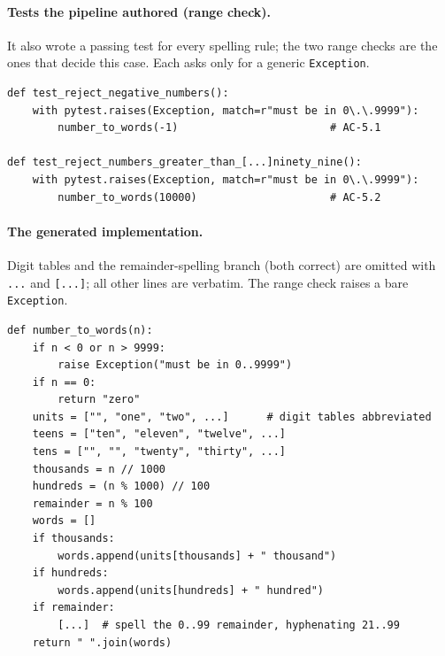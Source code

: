 \paragraph{Tests the pipeline authored (range check).} It also wrote a passing test for every
spelling rule; the two range checks are the ones that decide this case. Each asks only for a
generic \texttt{Exception}.
\begin{small}
\begin{Verbatim}[breaklines,breakanywhere]
def test_reject_negative_numbers():
    with pytest.raises(Exception, match=r"must be in 0\.\.9999"):
        number_to_words(-1)                        # AC-5.1

def test_reject_numbers_greater_than_[...]ninety_nine():
    with pytest.raises(Exception, match=r"must be in 0\.\.9999"):
        number_to_words(10000)                     # AC-5.2
\end{Verbatim}
\end{small}

\paragraph{The generated implementation.} Digit tables and the remainder-spelling branch (both
correct) are omitted with \texttt{...} and \texttt{[...]}; all other lines are verbatim. The range
check raises a bare \texttt{Exception}.
\begin{small}
\begin{Verbatim}[breaklines,breakanywhere]
def number_to_words(n):
    if n < 0 or n > 9999:
        raise Exception("must be in 0..9999")
    if n == 0:
        return "zero"
    units = ["", "one", "two", ...]      # digit tables abbreviated
    teens = ["ten", "eleven", "twelve", ...]
    tens = ["", "", "twenty", "thirty", ...]
    thousands = n // 1000
    hundreds = (n % 1000) // 100
    remainder = n % 100
    words = []
    if thousands:
        words.append(units[thousands] + " thousand")
    if hundreds:
        words.append(units[hundreds] + " hundred")
    if remainder:
        [...]  # spell the 0..99 remainder, hyphenating 21..99
    return " ".join(words)
\end{Verbatim}
\end{small}

